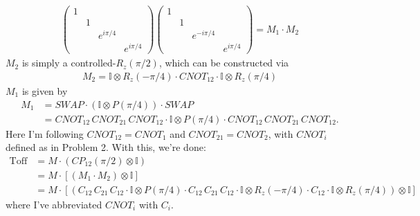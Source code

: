 \documentclass{article}
\theoremstyle{definition}
\begin{document}
\begin{enumerate}[label=(\alph*)]
\begin{align*}
\begin{pmatrix}
		1&&&\\
		&1&&\\
		&&e^{i\pi/4}&\\
		&&&e^{i\pi/4}
	\end{pmatrix}
\begin{pmatrix}
	1&&&\\
	&1&&\\
	&&e^{-i\pi/4}&\\
	&&&e^{i\pi/4}
\end{pmatrix} = M_1 \cdot M_2
\end{align*}
$M_2$ is simply a controlled-$R_z(\pi/2)$, which can be constructed via
\begin{align*}
	M_2 = \mathbb{I}\otimes R_z(-\pi/4) \cdot CNOT_{12} \cdot \mathbb{I}\otimes R_z(\pi/4)
\end{align*}
$M_1$ is given by 
\begin{align*}
	M_1 &= SWAP \cdot (\mathbb{I}\otimes P(\pi/4)) \cdot SWAP \\
	&= CNOT_{12}\,CNOT_{21}\, CNOT_{12} \cdot \mathbb{I}\otimes P(\pi/4) \cdot CNOT_{12}\, CNOT_{21}\, CNOT_{12}.
\end{align*}
Here I'm following $CNOT_{12} = CNOT_1$ and $CNOT_{21} = CNOT_2$, with $CNOT_i$ defined as in Problem 2. With this, we're done:
\begin{align*}
	\text{Toff} 
	&= M\cdot ( CP_{12}(\pi/2) \otimes \mathbb{I})\\
	&= M\cdot  [ (M_1\cdot M_2) \otimes \mathbb{I}] \\
	&= M\cdot [ (C_{12}\,C_{21}\, C_{12} \cdot \mathbb{I}\otimes P(\pi/4) \cdot C_{12}\, C_{21}\, C_{12}\cdot \mathbb{I}\otimes R_z(-\pi/4) \cdot C_{12} \cdot \mathbb{I}\otimes R_z(\pi/4) ) \otimes \mathbb{I}]
\end{align*}
where I've abbreviated $CNOT_i$ with $C_i$.



\end{enumerate}
\end{document}
